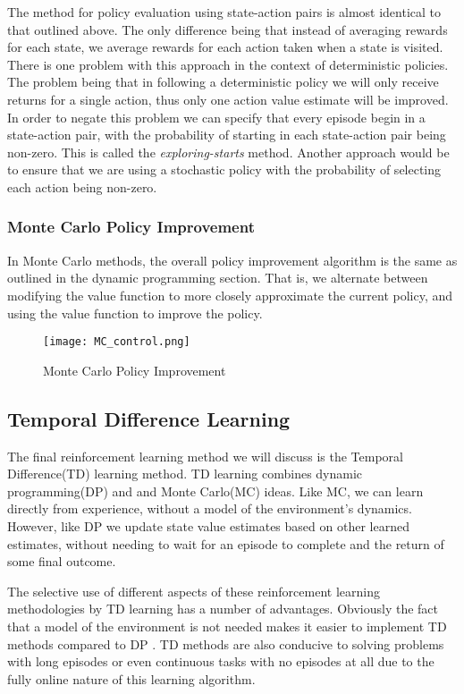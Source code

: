 The method for policy evaluation using state-action pairs is almost identical to that outlined above.
The only difference being that instead of averaging rewards for each state, we average
rewards for each action taken when a state is visited.
There is one problem with this approach in the context of deterministic policies.
The problem being that in following a deterministic policy we will only receive returns
for a single action, thus only one action value estimate will be improved.
In order to negate this problem we can specify that every episode begin in a state-action pair,
with the probability of starting in each state-action pair being non-zero.
This is called the \textit{exploring-starts} method.
Another approach would be to ensure that we are using a stochastic policy with
the probability of selecting each action being non-zero.

\subsubsection{Monte Carlo Policy Improvement}
In Monte Carlo methods, the overall policy improvement algorithm is the same as outlined in the dynamic
programming section.
That is, we alternate between modifying the value function to more closely approximate the current policy,
and using the value function to improve the policy.
\begin{figure}[ht]
    \texttt{[image: MC\_control.png]}
    \caption{Monte Carlo Policy Improvement}
\end{figure}

\subsection{Temporal Difference Learning}\label{subsec:td}
The final reinforcement learning method we will discuss is the Temporal Difference(TD) learning method.
TD learning combines dynamic programming(DP) and and Monte Carlo(MC) ideas\citep{sutton1998reinforcement}.
Like MC, we can learn directly from experience, without a model of the environment's dynamics.
However, like DP we update state value estimates based on other learned estimates, without needing to wait for an
episode to complete and the return of some final outcome.

The selective use of different aspects of these reinforcement learning methodologies by TD learning has
a number of advantages.
Obviously the fact that a model of the environment is not needed makes it easier to implement TD methods
compared to DP .
TD methods are also conducive to solving problems with long episodes or even continuous tasks with no
episodes at all due to the fully online nature of this learning algorithm.

